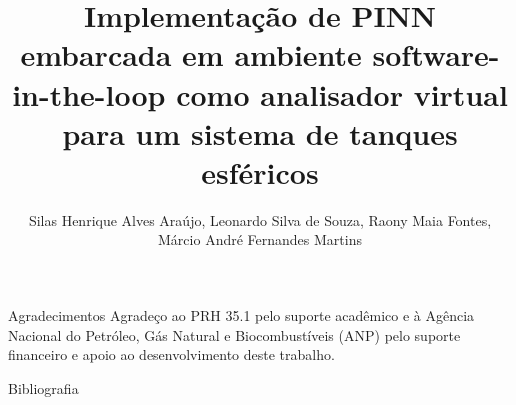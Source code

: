 \documentclass[aspectratio=169]{beamer}
\title[PINN embarcada em ambiente software-in-the-loop como analisador virtual]{Implementação de PINN embarcada em ambiente software-in-the-loop como analisador virtual para um sistema de tanques esféricos}
\author[Silas Henrique Alves Araújo]{Silas Henrique Alves Araújo, Leonardo Silva de Souza, Raony Maia Fontes, Márcio André Fernandes Martins}
\institute{Universidade Federal da Bahia}
\begin{document}
{

}







{
  \begin{frame}{Agradecimentos}
    \centering \large Agradeço ao PRH 35.1 pelo suporte acadêmico e à Agência Nacional do Petróleo, Gás Natural e Biocombustíveis (ANP) pelo suporte financeiro e apoio ao desenvolvimento deste trabalho.
  \end{frame}
}

\begin{frame}[allowframebreaks]{Bibliografia}
  \printbibliography
\end{frame}
\end{document}

